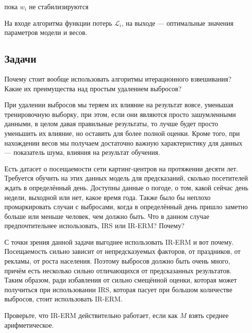 пока $w_i$ не стабилизируются

На входе алгоритма функции потерь $\mathscr{L}_i$, на выходе — оптимальные значения параметров модели и весов.

\subsection{Задачи}

\problem

Почему стоит вообще использовать алгоритмы итерационного взвешивания? Какие их преимущества над простым удалением выбросов? 

\begin{solution}
    При удалении выбросов мы теряем их влияние на результат вовсе, уменьшая тренировочную выборку, при этом, если они являются просто зашумленными данными, в целом давая правильные результаты, то лучше будет просто уменьшить их влияние, но оставить для более полной оценки. Кроме того, при нахождении весов мы получаем достаточно важную характеристику для данных — показатель шума, влияния на результат обучения.
\end{solution}

\problem

Есть датасет о посещаемости сети картинг-центров на протяжении десяти лет. Требуется обучить на этих данных модель для предсказаний, сколько посетителей ждать в определённый день. Доступны данные о погоде, о том, какой сейчас день недели, выходной или нет, какое время года. Также было бы неплохо промаркировать случаи с выбросами, когда в определённый день пришло заметно больше или меньше человек, чем должно быть. Что в данном случае предпочтительнее использовать, IRS или IR-ERM? Почему?


\begin{solution}

    С точки зрения данной задачи выгоднее использовать IR-ERM и вот почему. Посещаемость сильно зависит от непредсказуемых факторов, от праздников, от рекламы, от роста населения. Поэтому выбросов должно быть очень много, причём есть несколько сильно отличающихся от предсказанных результатов. Таким образом, ради избавления от сильно смещённой оценки, которая может получиться при использовании IRS, которая пасует при большом количестве выбросов, стоит использовать IR-ERM.

\end{solution}


\problem

Проверьте, что IR-ERM действительно работает, если как $M$ взять среднее арифметическое.

